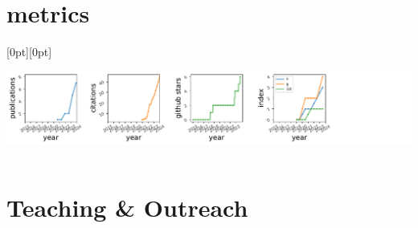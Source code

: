 \documentclass[]{scoggins-cv} %
\def\faVideoCamera{{\FA\symbol{"F03D}}}
\def\faCloudDownload{{\FA\symbol{"F0ED}}}
\begin{document}

\ifdefined \onepage \else
    \section{metrics}

    \raisebox{-0.9\height}[0pt][0pt]{
        \includegraphics[height=1.25in]{metrics.pdf}
    }
    \pagebreak
\fi


\section{Teaching \& Outreach}
\end{document}
